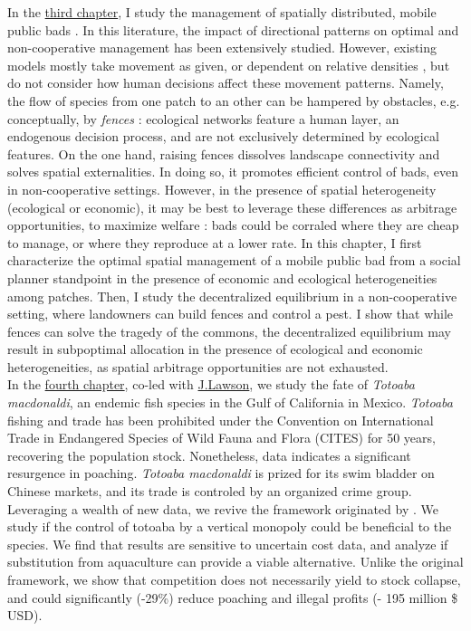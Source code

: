 In the \hyperref[chapter3]{third chapter}, I study the management of spatially distributed, mobile public bads \citep{costello_private_2017}.
In this literature, the impact of directional patterns on optimal and non-cooperative management has been extensively studied. However, existing models mostly take movement as given, or dependent on relative densities \citep{huffaker_optimal_1992,bhat_controlling_1996, sanchirico_bioeconomics_1999}, but do not consider how human decisions affect these movement patterns. 
Namely, the flow of species from one patch to an other can be hampered by obstacles, e.g. conceptually, by \textit{fences} : ecological networks feature a human layer, an endogenous decision process, and are not exclusively determined by ecological features. On the one hand, raising fences dissolves landscape connectivity and solves spatial externalities. In doing so, it promotes efficient control of bads, even in non-cooperative settings. However, in the presence of spatial heterogeneity (ecological or economic), it may be best to leverage these differences as arbitrage opportunities, to maximize welfare : bads could be corraled where they are cheap to manage, or where they reproduce at a lower rate. In this chapter, I first characterize the optimal spatial management of a mobile public bad from a social planner standpoint in the presence of economic and ecological heterogeneities among patches. Then, I study the decentralized equilibrium in a non-cooperative setting, where landowners can build fences and control a pest. I show that while fences can solve the tragedy of the commons, the decentralized equilibrium may result in subpoptimal allocation in the presence of ecological and economic heterogeneities, as spatial arbitrage opportunities are not exhausted. \\

In the \hyperref[chapter4]{fourth chapter}, co-led with \href{https://www.juliamlawson.com/}{J.Lawson}, we study the fate of \textit{Totoaba macdonaldi}, an endemic fish species in the Gulf of California in Mexico. \textit{Totoaba} fishing and trade has been prohibited under the Convention on International Trade in Endangered Species of Wild Fauna and Flora (CITES) for 50 years, recovering the population stock. Nonetheless, data indicates a significant resurgence in poaching. \textit{Totoaba macdonaldi} is prized for its swim bladder on Chinese markets, and its trade is controled by an organized crime group. Leveraging a wealth of new data, we revive the framework originated by \cite{damania_economics_2007}. We study if the control of totoaba by a vertical monopoly could be beneficial to the species. We find that results are sensitive to uncertain cost data, and analyze if substitution from aquaculture can provide a viable alternative. Unlike the original framework, we show that competition does not necessarily yield to stock collapse, and could significantly (-29\%) reduce poaching and illegal profits (- 195 million \$ USD).

